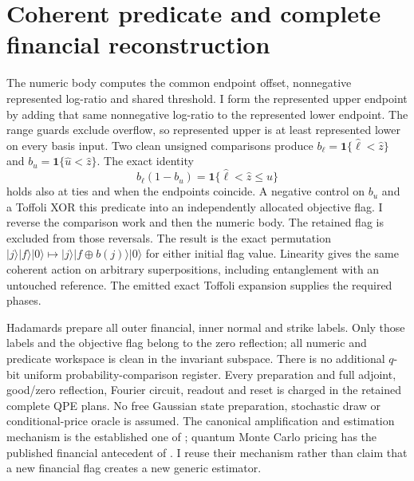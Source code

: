 \documentclass[11pt]{article}
\begin{document}
\section{Coherent predicate and complete financial reconstruction}

The numeric body computes the common endpoint offset, nonnegative
represented log-ratio and shared threshold. I form the represented upper
endpoint by adding that same nonnegative log-ratio to the represented
lower endpoint. The range guards exclude overflow, so represented upper
is at least represented lower on every basis input. Two clean unsigned
comparisons produce
$b_\ell=\mathbf1\{\widehat\ell<\widehat z\}$ and
$b_u=\mathbf1\{\widehat u<\widehat z\}$.
The exact identity
\[
 b_\ell(1-b_u)
  =\mathbf1\{\widehat\ell<\widehat z\leq\widehat u\}
\]
holds also at ties and when the endpoints coincide. A negative control on
$b_u$ and a Toffoli XOR this predicate into an independently allocated
objective flag. I reverse the comparison work and then the numeric body.
The retained flag is excluded from those reversals. The result is the
exact permutation
$|j\rangle|f\rangle|0\rangle\mapsto
 |j\rangle|f\mathbin\oplus b(j)\rangle|0\rangle$ for either initial
flag value. Linearity gives the same coherent action on arbitrary
superpositions, including entanglement with an untouched reference.
The emitted exact Toffoli expansion supplies the required phases.

Hadamards prepare all outer financial, inner normal and strike labels.
Only those labels and the objective flag belong to the zero reflection;
all numeric and predicate workspace is clean in the invariant subspace.
There is no additional $q$-bit uniform probability-comparison register.
Every preparation and full adjoint, good/zero reflection, Fourier circuit,
readout and reset is charged in the retained complete QPE plans.
No free Gaussian state preparation, stochastic draw or conditional-price
oracle is assumed.
The canonical amplification and estimation mechanism is the established
one of \citet{brassard}; quantum Monte Carlo pricing has the published
financial antecedent of \citet{rebentrost}. I reuse their mechanism rather
than claim that a new financial flag creates a new generic estimator.
\end{document}
